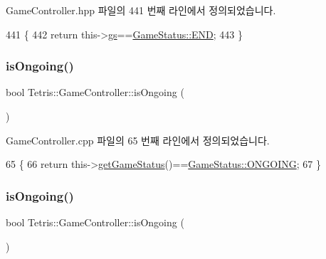 Game\+Controller.\+hpp 파일의 441 번째 라인에서 정의되었습니다.


\begin{DoxyCode}
441                         \{
442                 \textcolor{keywordflow}{return} this->\hyperlink{class_tetris_1_1_game_controller_ae4c894005a82404c73a5a9a6efb208dc}{gs}==\hyperlink{class_tetris_1_1_game_controller_a96a963b56385f3b3a122ff0ca2beb770ab1a326c06d88bf042f73d70f50197905}{GameStatus::END};
443             \}
\end{DoxyCode}
\mbox{\label{class_tetris_1_1_game_controller_aecd04e471f7819a8b3f80e0dda748bdc}} 
\subsubsection{\texorpdfstring{is\+Ongoing()}{isOngoing()}\hspace{0.1cm}{\footnotesize\ttfamily [1/2]}}
{\footnotesize\ttfamily bool Tetris\+::\+Game\+Controller\+::is\+Ongoing (\begin{DoxyParamCaption}{ }\end{DoxyParamCaption})}



Game\+Controller.\+cpp 파일의 65 번째 라인에서 정의되었습니다.


\begin{DoxyCode}
65                                   \{
66                 \textcolor{keywordflow}{return} this->\hyperlink{class_tetris_1_1_game_controller_a3b95b1b7a3a18c27402100f70c1ac1ab}{getGameStatus}()==\hyperlink{class_tetris_1_1_game_controller_a96a963b56385f3b3a122ff0ca2beb770acff9d04a8a29792d319be9177afb8ba3}{GameStatus::ONGOING};
67             \}
\end{DoxyCode}
\mbox{\label{class_tetris_1_1_game_controller_aecd04e471f7819a8b3f80e0dda748bdc}} 
\subsubsection{\texorpdfstring{is\+Ongoing()}{isOngoing()}\hspace{0.1cm}{\footnotesize\ttfamily [2/2]}}
{\footnotesize\ttfamily bool Tetris\+::\+Game\+Controller\+::is\+Ongoing (\begin{DoxyParamCaption}{ }\end{DoxyParamCaption})\hspace{0.3cm}{\ttfamily [inline]}}

